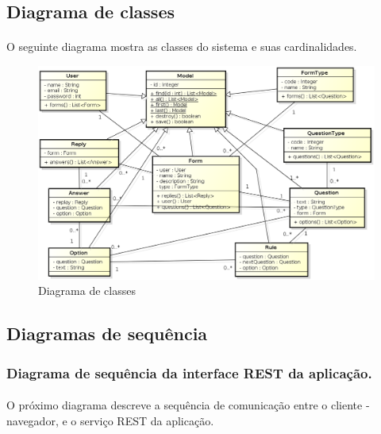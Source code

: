 \documentclass[11pt]{article}
\begin{document}
    \subsection{Diagrama de classes}
    
      \paragraph{}
      O seguinte diagrama mostra as classes do sistema e suas cardinalidades.
    
      \begin{figure}[h!]
        \centering
        \includegraphics[width=1.0\textwidth]{class_diagram.png}
        \caption{Diagrama de classes}
      \end{figure}
        
  \clearpage
  
    \subsection{Diagramas de sequência}
    
      \subsubsection{Diagrama de sequência da interface REST da aplicação.}
    
      \paragraph{}
      O próximo diagrama descreve a sequência de comunicação entre o cliente - navegador, e o 
      serviço REST da aplicação.
\end{document}

